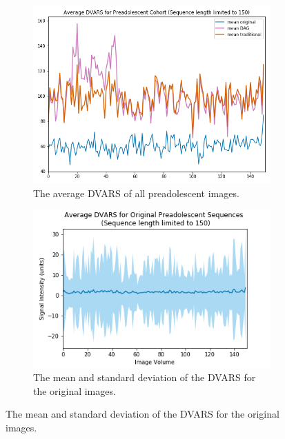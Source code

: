 \begin{figure}[ht]
	\centering
	\begin{subfigure}{0.45\textwidth}
		\centering
		\includegraphics[width=1\textwidth]{6/figures/pread_dvars_all_150_avg.png}
		\caption{The average DVARS of all preadolescent images.}
	\end{subfigure}%
	\vspace{0.05\textwidth}
	\begin{subfigure}{0.45\textwidth}
		\centering
		\includegraphics[width=1\textwidth]{6/figures/pread-bold-dvars-150.png}
		\caption{The mean and standard deviation of the DVARS for the original images.}
	\end{subfigure}
	

\end{figure}
